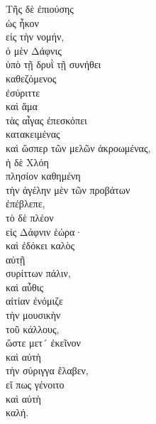 {\large
\begin{greek}
\noindent Τῆς δὲ ἐπιούσης \\
\tabto{2em} ὡς ἧκον \\
\tabto{4em} εἰς τὴν νομήν, \\
ὁ μὲν Δάφνις \\
\tabto{2em} ὑπὸ τῇ δρυῒ τῇ συνήθει \\
\tabto{4em} καθεζόμενος \\
ἐσύριττε \\
καὶ ἅμα \\
\tabto{4em} τὰς αἶγας ἐπεσκόπει \\
\tabto{6em} κατακειμένας \\
\tabto{6em} καὶ ὥσπερ τῶν μελῶν ἀκροωμένας, \\
ἡ δὲ Χλόη \\
\tabto{2em} πλησίον καθημένη \\
\tabto{2em} τὴν ἀγέλην μὲν τῶν προβάτων \\
ἐπέβλεπε, \\
\tabto{2em} τὸ δὲ πλέον \\
\tabto{2em} εἰς Δάφνιν ἑώρα· \\
καὶ ἐδόκει καλὸς \\
\tabto{2em} αὐτῇ \\
συρίττων πάλιν, \\

καὶ αὖθις \\
\tabto{2em} αἰτίαν ἐνόμιζε \\
\tabto{4em} τὴν μουσικὴν \\
\tabto{6em} τοῦ κάλλους, \\
ὥστε μετ´ ἐκεῖνον \\
\tabto{2em} καὶ αὐτὴ \\
\tabto{2em} τὴν σύριγγα ἔλαβεν, \\
\tabto{4em} εἴ πως γένοιτο \\
\tabto{6em} καὶ αὐτὴ \\
\tabto{4em} καλή.\\

\end{greek}
}

